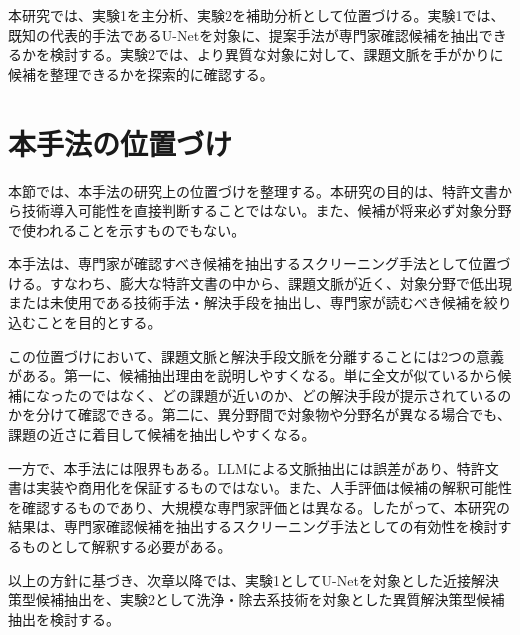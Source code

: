 本研究では、実験1を主分析、実験2を補助分析として位置づける。実験1では、既知の代表的手法であるU-Netを対象に、提案手法が専門家確認候補を抽出できるかを検討する。実験2では、より異質な対象に対して、課題文脈を手がかりに候補を整理できるかを探索的に確認する。

\section{本手法の位置づけ}

本節では、本手法の研究上の位置づけを整理する。本研究の目的は、特許文書から技術導入可能性を直接判断することではない。また、候補が将来必ず対象分野で使われることを示すものでもない。

本手法は、専門家が確認すべき候補を抽出するスクリーニング手法として位置づける。すなわち、膨大な特許文書の中から、課題文脈が近く、対象分野で低出現または未使用である技術手法・解決手段を抽出し、専門家が読むべき候補を絞り込むことを目的とする。

この位置づけにおいて、課題文脈と解決手段文脈を分離することには2つの意義がある。第一に、候補抽出理由を説明しやすくなる。単に全文が似ているから候補になったのではなく、どの課題が近いのか、どの解決手段が提示されているのかを分けて確認できる。第二に、異分野間で対象物や分野名が異なる場合でも、課題の近さに着目して候補を抽出しやすくなる。

一方で、本手法には限界もある。LLMによる文脈抽出には誤差があり、特許文書は実装や商用化を保証するものではない。また、人手評価は候補の解釈可能性を確認するものであり、大規模な専門家評価とは異なる。したがって、本研究の結果は、専門家確認候補を抽出するスクリーニング手法としての有効性を検討するものとして解釈する必要がある。

以上の方針に基づき、次章以降では、実験1としてU-Netを対象とした近接解決策型候補抽出を、実験2として洗浄・除去系技術を対象とした異質解決策型候補抽出を検討する。
